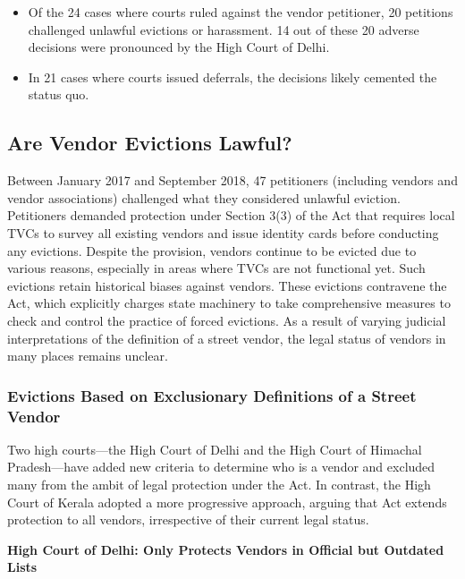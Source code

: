 \documentclass[a4paper, 12pt, twoside]{article}
\begin{document}
\begin{itemize}

\begin{itemize}
\item Of the 24 cases where courts ruled against the vendor petitioner, 20 petitions challenged unlawful evictions or harassment. 14 out of these 20 adverse decisions were pronounced by the High Court of Delhi.
\item In 21 cases where courts issued deferrals, the decisions likely cemented the status quo.
\end{itemize}
\end{itemize}

\subsection*{Are Vendor Evictions Lawful?}

Between January 2017 and September 2018, 47 petitioners (including vendors and vendor associations) challenged what they considered unlawful eviction. Petitioners demanded protection under Section 3(3) of the Act that requires local TVCs to survey all existing vendors and issue identity cards before conducting any evictions. Despite the provision, vendors continue to be evicted due to various reasons, especially in areas where TVCs are not functional yet. Such evictions retain historical biases against vendors. These evictions contravene the Act, which explicitly charges state machinery to take comprehensive measures to check and control the practice of forced evictions. As a result of varying judicial interpretations of the definition of a street vendor, the legal status of vendors in many places remains unclear.

\subsubsection*{Evictions Based on Exclusionary Definitions of a Street Vendor}


Two high courts—the High Court of Delhi and the High Court of Himachal Pradesh—have added new criteria to determine who is a vendor and excluded many from the ambit of legal protection under the Act. In contrast, the High Court of Kerala adopted a more progressive approach, arguing that Act extends protection to all vendors, irrespective of their current legal status.

\textbf{High Court of Delhi: Only Protects Vendors in Official but Outdated Lists}
\end{document}
